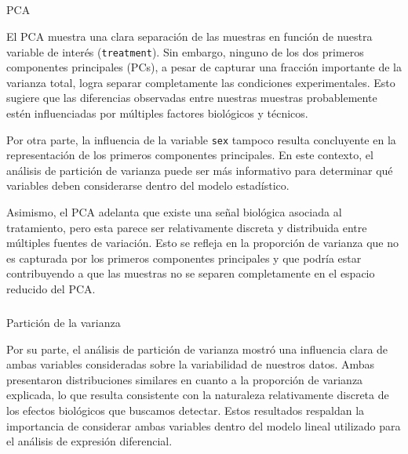 \documentclass[
  10pt,
]{article}
\makeatletter
\let\oldsubparagraph\subparagraph
\renewcommand{\subparagraph}{
    \@ifstar
      \xxxSubParagraphStar
      \xxxSubParagraphNoStar
  }
\newcommand{\xxxSubParagraphStar}[1]{\oldsubparagraph*{#1}\mbox{}}
\newcommand{\xxxSubParagraphNoStar}[1]{\oldsubparagraph{#1}\mbox{}}
\newenvironment{Shaded}{\begin{snugshade}}{\end{snugshade}}
\newcommand{\NormalTok}[1]{\textcolor[rgb]{0.00,0.23,0.31}{#1}}
\makeatother
\begin{document}
\subparagraph{PCA}\label{pca}

\begin{Shaded}
\end{Shaded}

El PCA muestra una clara separación de las muestras en función de
nuestra variable de interés (\texttt{treatment}). Sin embargo, ninguno
de los dos primeros componentes principales (PCs), a pesar de capturar
una fracción importante de la varianza total, logra separar
completamente las condiciones experimentales. Esto sugiere que las
diferencias observadas entre nuestras muestras probablemente estén
influenciadas por múltiples factores biológicos y técnicos.

Por otra parte, la influencia de la variable \texttt{sex} tampoco
resulta concluyente en la representación de los primeros componentes
principales. En este contexto, el análisis de partición de varianza
puede ser más informativo para determinar qué variables deben
considerarse dentro del modelo estadístico.

Asimismo, el PCA adelanta que existe una señal biológica asociada al
tratamiento, pero esta parece ser relativamente discreta y distribuida
entre múltiples fuentes de variación. Esto se refleja en la proporción
de varianza que no es capturada por los primeros componentes principales
y que podría estar contribuyendo a que las muestras no se separen
completamente en el espacio reducido del PCA.

\subparagraph{Partición de la
varianza}\label{particiuxf3n-de-la-varianza}

\begin{Shaded}
\end{Shaded}

Por su parte, el análisis de partición de varianza mostró una influencia
clara de ambas variables consideradas sobre la variabilidad de nuestros
datos. Ambas presentaron distribuciones similares en cuanto a la
proporción de varianza explicada, lo que resulta consistente con la
naturaleza relativamente discreta de los efectos biológicos que buscamos
detectar. Estos resultados respaldan la importancia de considerar ambas
variables dentro del modelo lineal utilizado para el análisis de
expresión diferencial.
\end{document}
